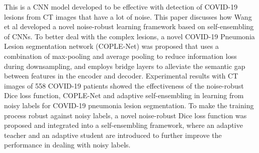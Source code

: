 \documentclass{sigkddExp}
\begin{document}
This is a CNN model \cite{wang2020covidnet} developed to be effective with
detection of COVID-19 lesions from CT images that have a lot of noise. This
paper discusses how Wang et al developed a novel noise-robust learning framework
based on self-ensembling of CNNs.  To better deal with the complex lesions, a
novel COVID-19 Pneumonia Lesion segmentation network (COPLE-Net) was proposed
that uses a combination of max-pooling and average pooling to reduce information
loss during downsampling, and employs bridge layers to alleviate the semantic
gap between features in the encoder and decoder. Experimental results with CT
images of 558 COVID-19 patients showed the effectiveness of the noise-robust
Dice loss function, COPLE-Net and adaptive self-ensembling in learning from
noisy labels for COVID-19 pneumonia lesion segmentation. To make the training
process robust against noisy labels, a novel noise-robust Dice loss function was
proposed and integrated into a self-ensembling framework, where an adaptive
teacher and an adaptive student are introduced to further improve the
performance in dealing with noisy labels.
\end{document}
